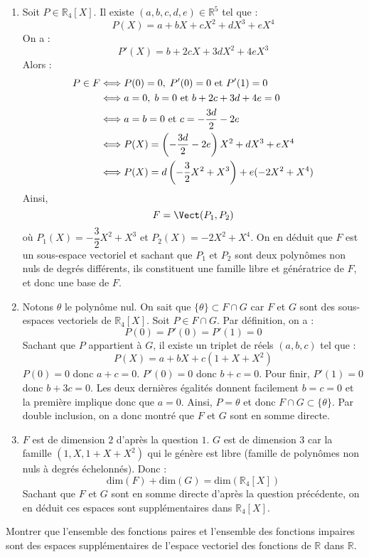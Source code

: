 \documentclass[a4paper,twoside,french,10pt]{VcCours}
\begin{document}
\begin{enumerate}
\item Soit $P \in \mathbb{R}_4[X]$. Il existe $(a,b,c,d,e) \in \mathbb{R}^5$ tel que :
$$ P(X) = a+bX+cX^2+dX^3+eX^4$$
On a :
$$ P'(X) = b+2cX+3dX^2+4eX^3$$
Alors :
\begin{align*}
P \in F & \Longleftrightarrow P(0)=0, \; P'(0)=0 \hbox{ et } P'(1)=0 \\
& \Longleftrightarrow a=0, \; b=0 \hbox{ et } b+2c+3d+4e = 0 \\
& \Longleftrightarrow a=b=0 \hbox{ et } c= -\dfrac{3d}{2} - 2e \\
& \Longleftrightarrow P(X) = \left( -\dfrac{3d}{2} - 2e \right)X^2 + d X^3 + eX^4 \\
& \Longleftrightarrow P(X) = d \left( - \dfrac{3}{2}X^2+ X^3 \right) + e (-2X^2+X^4)
\end{align*}
Ainsi,
$$ F= \Vect(P_1,P_2)$$
où $P_1(X) = - \dfrac{3}{2}X^2+ X^3$ et $P_2(X)= -2X^2+X^4$. On en déduit que $F$ est un sous-espace vectoriel et sachant que $P_1$ et $P_2$ sont deux polynômes non nuls de degrés différents, ils constituent une famille libre et génératrice de $F$, et donc une base de $F$.
\item Notons $\theta$ le polynôme nul. On sait que $\lbrace \theta \rbrace \subset F \cap G$ car $F$ et $G$ sont des sous-espaces vectoriels de $\mathbb{R}_4[X]$. Soit $P \in F \cap G$. Par définition, on a :
$$ P(0)=P'(0)=P'(1)=0$$
Sachant que $P$ appartient à $G$, il existe un triplet de réels $(a,b,c)$ tel que :
$$ P(X)= a + bX + c(1+X+X^2)$$
$P(0)=0$ donc $a+c=0$. $P'(0)=0$ donc $b+c=0$. Pour finir, $P'(1)=0$ donc $b+3c=0$. Les deux dernières égalités donnent facilement $b=c=0$ et la première implique donc que $a=0$. Ainsi, $P= \theta$ et donc $ F \cap G \subset \lbrace \theta \rbrace$. Par double inclusion, on a donc montré que $F$ et $G$ sont en somme directe.
\item $F$ est de dimension $2$ d'après la question $1$. $G$ est de dimension $3$ car la famille $(1,X,1+X+X^2)$ qui le génère est libre (famille de polynômes non nuls à degrés échelonnés). Donc :
$$ \textrm{dim}(F)+ \textrm{dim}(G) = \textrm{dim}(\mathbb{R}_4[X])$$
Sachant que $F$ et $G$ sont en somme directe d'après la question précédente, on en déduit ces espaces sont supplémentaires dans $\mathbb{R}_4[X]$.
\end{enumerate}

\medskip

\begin{Exercice}{} Montrer que l'ensemble des fonctions paires et l'ensemble des fonctions impaires sont des espaces supplémentaires de l'espace vectoriel des fonctions de $\mathbb{R}$ dans $\mathbb{R}$. 
\end{Exercice}
\end{document}
